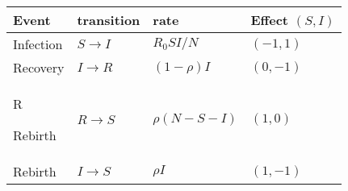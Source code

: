 \documentclass[12pt]{article}
\begin{document}
\begin{center}\begin{tabular}{llll}
   {\bf Event} & {\bf transition} &{\bf rate} &{\bf Effect $(S,I)$}\\
   \hline
   Infection &$S \to I$  &$R_0 SI/N$ & $(-1,1)$\\
   Recovery & $I \to R$ & $(1-\rho)I$ & $(0,-1)$\\
	R


   Rebirth &  $R \to S$ & $\rho (N-S-I)$ & $(1,0)$\\
   Rebirth & $I \to S$ & $\rho I$ & $(1,-1)$
\end{tabular}\end{center}
\end{document}

